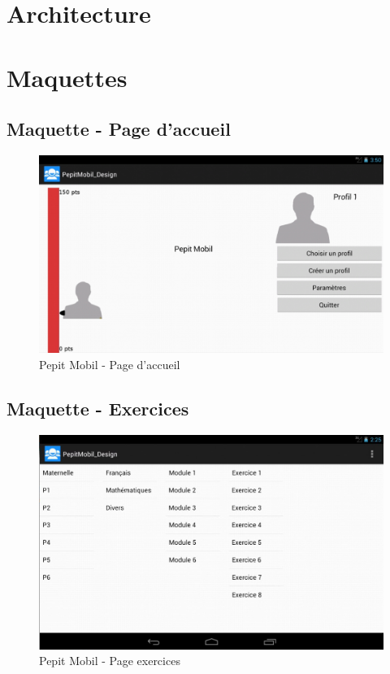 \chapter{Architecture}
\label{annexe_architecture}



\chapter{Maquettes}
\section*{Maquette - Page d'accueil}
\begin{figure}[H]
\begin{center}
\includegraphics[width=15cm]{images/maquettes_homePage}
\end{center}
\caption{Pepit Mobil - Page d'accueil}
\label{Pepit Mobil - Page d'accueil}
\end{figure}

\section*{Maquette - Exercices}
\begin{figure}[H]
\begin{center}
\includegraphics[width=15cm]{images/maquettes_exercices}
\end{center}
\caption{Pepit Mobil - Page exercices}
\label{Pepit Mobil - Page exercices}
\end{figure}

